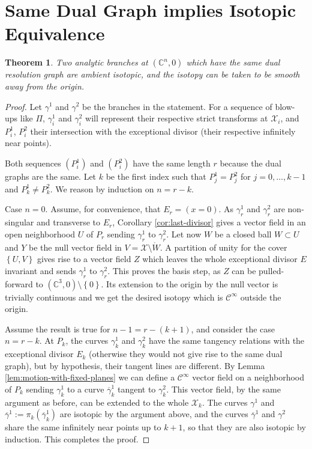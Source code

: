 \documentclass[a4paper,10pt]{amsart}
\newtheorem{theorem}{Theorem}
\begin{document}
\section{Same Dual Graph implies Isotopic Equivalence}
\begin{theorem}
  Two analytic branches at $(\mathbb{C}^n,0)$ which have the same dual resolution graph are ambient isotopic, and the isotopy can be taken to be smooth away from the origin.
\end{theorem}
\begin{proof}
  Let $\gamma^{1}$ and $\gamma^{2}$ be the branches in the statement. For a sequence of blow-ups like $\Pi$, $\gamma^1_i$ and $\gamma^2_i$ will represent their respective strict transforms at $\mathcal{X}_i$, and $P^1_i$, $P^2_i$ their intersection with the exceptional divisor (their respective infinitely near points).

  Both sequences $(P^{1}_i)$ and $(P_i^2)$ have the same length $r$ because the dual graphs are the same. Let $k$ be the first index such that $P^{1}_j=P^{2}_j$ for $j=0,\ldots, k-1$ and $P^1_k\neq P^2_k$. We reason by induction on $n=r-k$.

  Case $n=0$. Assume, for convenience, that $E_r=(x=0)$. As $\gamma^{1}_{r}$ and $\gamma^{2}_r$ are non-singular and transverse to $E_{r}$, Corollary \ref{cor:last-divisor} gives a vector field in an open neighborhood $U$ of $P_r$ sending $\gamma^1_r$ to $\gamma^2_r$. Let now $W$ be a closed ball $W\subset U$ and $Y$ be the null vector field in $V=\mathcal{X}\setminus \mathring{W}$. A partition of unity for the cover $\left\{ U,V \right\}$ gives rise to a vector field $Z$ which leaves the whole exceptional divisor $E$ invariant and sends $\gamma^1_{r}$ to $\gamma^2_{r}$. This proves the basis step, as $Z$ can be pulled-forward to $(\mathbb{C}^3,0)\setminus \left\{ 0 \right\}$. Its extension to the origin by the null vector is trivially continuous and we get the desired isotopy which is $\mathcal{C}^{\infty}$ outside the origin.

  Assume the result is true for $n-1=r-(k+1)$, and consider the case $n=r-k$. At $P_k$, the curves $\gamma^1_k$ and $\gamma^2_k$ have the same tangency relations with the exceptional divisor $E_k$ (otherwise they would not give rise to the same dual graph), but by hypothesis, their tangent lines are different. By Lemma \ref{lem:motion-with-fixed-planes} we can define a $\mathcal{C}^{\infty}$ vector field on a neighborhood of $P_k$ sending $\gamma^1_k$ to a curve $\overline{\gamma}^1_{k}$ tangent to $\gamma^2_k$. This vector field, by the same argument as before, can be extended to the whole $\mathcal{X}_k$. The curves $\gamma^1$ and $\overline{\gamma}^1:=\pi_k(\overline{\gamma}^1_k)$ are isotopic by the argument above, and the curves $\overline{\gamma}^{1}$ and $\gamma^2$ share the same infinitely near points up to $k+1$, so that they are also isotopic by induction. This completes the proof.
\end{proof}
\end{document}
